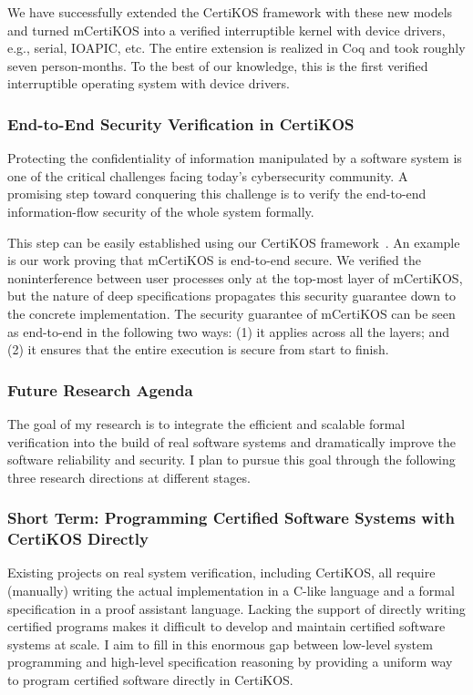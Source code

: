 \documentclass[a4paper, 10pt]{article}
\begin{document}
\begin{small}
We have successfully extended the CertiKOS framework with these new models
and turned mCertiKOS
into a verified interruptible kernel with device
drivers, e.g., serial, IOAPIC, etc. 
The entire extension is realized in Coq and took roughly seven person-months.
To the best of our knowledge, this is the first verified
interruptible operating system with device drivers.

\subsubsection*{\small End-to-End Security Verification in CertiKOS}
Protecting the confidentiality of information manipulated by
a software system is one of the critical challenges
facing today's cybersecurity community. A promising step
toward conquering this challenge is to  verify  the
end-to-end information-flow
security of the whole system formally. 

This step can be easily established
using our CertiKOS framework~\cite{pldi16-security}. An example is our work proving
that mCertiKOS is end-to-end secure. We verified the noninterference between user processes 
only at the top-most layer of mCertiKOS, but the nature of deep specifications propagates
this security guarantee down to the concrete implementation.
The security guarantee of mCertiKOS
can be seen as end-to-end in the following two ways: (1)
it applies across all the layers; and (2) it ensures that the entire
execution is secure from start to finish.

\subsubsection*{\large Future Research Agenda}
The goal of my research is to
integrate the efficient and scalable formal verification
into the build of real software systems
and dramatically improve the software reliability and security. 
I plan to pursue this goal through the following three research directions at different stages.


\subsubsection*{\small Short Term: Programming Certified Software Systems with CertiKOS Directly}
Existing  projects on real system verification,
including CertiKOS, all require   (manually)  writing the actual implementation
 in a C-like language and a formal specification in a proof assistant language.
Lacking the support of directly writing certified  programs  makes it difficult to develop and maintain certified  software systems
at scale. I aim to fill in this enormous gap between low-level system programming and high-level specification reasoning
by
providing
a uniform way to program certified software directly in CertiKOS.


\end{small}
\end{document}
